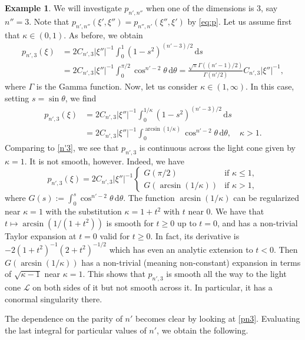 \documentclass[11pt]{amsart}
\theoremstyle{definition}
\newtheorem{example}[theorem]{Example}
\theoremstyle{remark}
\numberwithin{equation}{section}
\renewcommand{\d}{\,\mathrm{d}}
\begin{document}
\begin{example}
We will investigate  $p_{n',n''}$ when one of the dimensions is $3$, say $n''=3$. Note that $p_{n',n''}(\xi', \xi'') = p_{n'',n'}(\xi'',\xi')$ by \eqref{eq:p}.   
Let us assume first that $\kappa \in (0,1)$. As before, we obtain
\begin{align}
p_{n',3}(\xi) &= 2 C_{n',3} |\xi''|^{-1} \int_0^1 (1-s^2)^{(n'-3)/2} \d s \\
&= 2 C_{n',3} |\xi''|^{-1} \int_{0}^{\pi/2} \cos^{n'-2} \theta \d \theta = \frac{\sqrt{\pi} \Gamma((n'-1)/2)}{\Gamma(n'/2)}  C_{n',3} |\xi''|^{-1}, \label{n'3}
\end{align}
where $\Gamma$ is the Gamma function. Now, let us consider $\kappa \in (1,\infty)$. In this case, setting $s=\sin\theta$, we find
\begin{align}\label{pn3}
    p_{n',3}(\xi) &= 2 C_{n',3} |\xi''|^{-1} \int_{0}^{1/\kappa} (1-s^2)^{(n'-3)/2} \d s \\
    &= 2 C_{n',3}  |\xi''|^{-1} \int_{0}^{\arcsin(1/\kappa)} \cos^{n'-2} \theta \d \theta, \quad \kappa>1. 
\end{align}
Comparing to \eqref{n'3}, we see that $p_{n',3}$ is continuous across the light cone given by $\kappa=1$. It is not smooth, however. Indeed, we have 
\begin{equation} 
p_{n',3}(\xi) =  2 C_{n',3} |\xi''|^{-1} \begin{cases}
  G(\pi/2) & \text{if $\kappa\le 1$},\\
 G(\arcsin(1/\kappa))& \text{if $\kappa>1$},
\end{cases}
\end{equation}
where $G(s):= \int_0^s \cos^{n'-2} \theta \d \theta$. The function $\arcsin(1/\kappa)$ can be regularized near $\kappa=1$ with the substitution $\kappa=1+t^2$ with $t$ near $0$. We have that  $t\mapsto \arcsin(1/(1+t^2))$ is smooth for $t\ge0$ up to $t=0$, and has a non-trivial Taylor expansion at $t=0$ valid for $t\ge0$. In fact, its derivative is $-2(1+t^2)^{-1} (2+t^2)^{-1/2}$ which has even an analytic extension to $t<0$. Then $G(\arcsin(1/\kappa))$ has a non-trivial (meaning non-constant) expansion in terms of $\sqrt{\kappa-1}$ near $\kappa=1$. This shows that $p_{n',3}$ is smooth all the way to the light cone  $\mathcal L$ on both sides of it but not smooth across it. In particular, it has a conormal singularity there. 


The dependence on the parity of $n'$ becomes clear by looking at \eqref{pn3}. Evaluating the last integral for particular values of $n'$, we obtain the following. 


\end{example}
\end{document}
